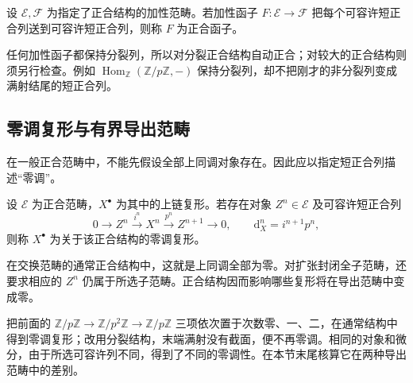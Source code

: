 \begin{definition}\label{b4:def:B-exact-functor}
	设 \(\mathcal E,\mathcal F\) 为指定了正合结构的加性范畴。若加性函子 \(F:\mathcal E\rightarrow\mathcal F\) 把每个可容许短正合列送到可容许短正合列，则称 \(F\) 为正合函子。
\end{definition}
任何加性函子都保持分裂列，所以对分裂正合结构自动正合；对较大的正合结构则须另行检查。例如 \(\operatorname{Hom}_{\mathbb Z}(\mathbb Z/p\mathbb Z,-)\) 保持分裂列，却不把刚才的非分裂列变成满射结尾的短正合列。

\subsection{零调复形与有界导出范畴}
\label{b4:subsec:B01:03}

在一般正合范畴中，不能先假设全部上同调对象存在。因此应以指定短正合列描述“零调”。
\begin{definition}\label{b4:def:B-exact-acyclic}
	设 \(\mathcal E\) 为正合范畴，\(X^\bullet\) 为其中的上链复形。若存在对象 \(Z^n\in\mathcal E\) 及可容许短正合列
	\[
		0\longrightarrow Z^n\xrightarrow{i^n}X^n \xrightarrow{p^n}Z^{n+1}\longrightarrow0, \qquad \mathrm{d}_X^n=i^{n+1}p^n,
	\]
	则称 \(X^\bullet\) 为关于该正合结构的零调复形。
\end{definition}

在交换范畴的通常正合结构中，这就是上同调全部为零。对扩张封闭全子范畴，还要求相应的 \(Z^n\) 仍属于所选子范畴。正合结构因而影响哪些复形将在导出范畴中变成零。

\ProseParagraphBreak
把前面的 \(\mathbb Z/p\mathbb Z\to\mathbb Z/p^2\mathbb Z\to\mathbb Z/p\mathbb Z\) 三项依次置于次数零、一、二，在通常结构中得到零调复形；改用分裂结构，末端满射没有截面，便不再零调。相同的对象和微分，由于所选可容许列不同，得到了不同的零调性。在本节末尾核算它在两种导出范畴中的差别。

